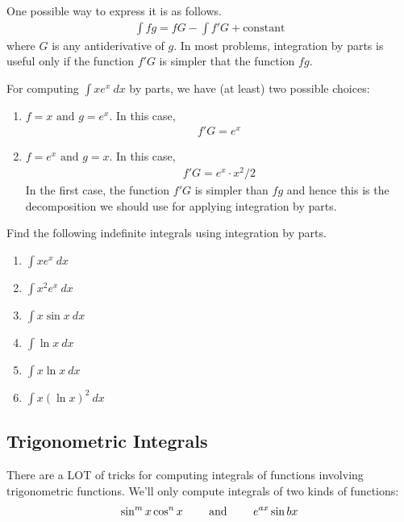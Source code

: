 One possible way to express it is as follows.
\begin{align}
	\int fg  =  fG - \int f' G  + \mathrm{constant}
\end{align}
where $G$ is any antiderivative of $g$.
In most problems, integration by parts is useful only if the function $f'G$ is simpler that the function $fg$.

\begin{example}
	For computing $\int x e^x \: dx$ by parts, we have (at least) two possible choices:
	\begin{enumerate}
		\item $f = x \mbox{ and } g = e^x$.
		      In this case,
		      \begin{align*}
			      f' G = e^x
		      \end{align*}
		\item $f = e^x \mbox{ and } g = x$.
		      In this case,
		      \begin{align*}
			      f' G = e^x \cdot x^2/2
		      \end{align*}
		      In the first case, the function $f' G$ is simpler than $fg$ and hence this is the decomposition we should use for applying integration by parts.
	\end{enumerate}
\end{example}

\begin{exercise}
	Find the following indefinite integrals using integration by parts.
	\begin{multicols}{2}
		\begin{enumerate}
			\item $\int x e^x\: dx$
			\item $\int x^2 e^{x}\: dx$
			\item $\int x \sin x\: dx$
			\item $\int \ln x \: dx$ 
			\item $\int x \ln x\: dx$
			\item $\int x (\ln x)^2\: dx$
		\end{enumerate}
	\end{multicols}
\end{exercise}


\subsection{Trigonometric Integrals}
There are a LOT of tricks for computing integrals of functions involving trigonometric functions.
We'll only compute integrals of two kinds of functions:
\begin{align*}
	\sin^ m x \cos^n x \mbox{ \qquad and \qquad } e^{ax} \sin bx
\end{align*}

